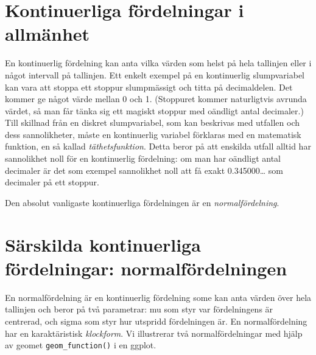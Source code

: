 \documentclass[
]{book}
\theoremstyle{definition}
\theoremstyle{definition}
\theoremstyle{definition}
\theoremstyle{definition}
\theoremstyle{remark}
\begin{document}
\hypertarget{kontinuerliga-fuxf6rdelningar-i-allmuxe4nhet}{%
\section{Kontinuerliga fördelningar i allmänhet}\label{kontinuerliga-fuxf6rdelningar-i-allmuxe4nhet}}

En kontinuerlig fördelning kan anta vilka värden som helst på hela tallinjen eller i något intervall på tallinjen. Ett enkelt exempel på en kontinuerlig slumpvariabel kan vara att stoppa ett stoppur slumpmässigt och titta på decimaldelen. Det kommer ge något värde mellan 0 och 1. (Stoppuret kommer naturligtvis avrunda värdet, så man får tänka sig ett magiskt stoppur med oändligt antal decimaler.) Till skillnad från en diskret slumpvariabel, som kan beskrivas med utfallen och dess sannolikheter, måste en kontinuerlig variabel förklaras med en matematisk funktion, en så kallad \emph{täthetsfunktion}. Detta beror på att enskilda utfall alltid har sannolikhet noll för en kontinuerlig fördelning: om man har oändligt antal decimaler är det som exempel sannolikhet noll att få exakt 0.345000\ldots{} som decimaler på ett stoppur.

Den absolut vanligaste kontinuerliga fördelningen är en \emph{normalfördelning}.

\hypertarget{suxe4rskilda-kontinuerliga-fuxf6rdelningar-normalfuxf6rdelningen}{%
\section{Särskilda kontinuerliga fördelningar: normalfördelningen}\label{suxe4rskilda-kontinuerliga-fuxf6rdelningar-normalfuxf6rdelningen}}

En normalfördelning är en kontinuerlig fördelning some kan anta värden över hela tallinjen och beror på två parametrar: mu som styr var fördelningens är centrerad, och sigma som styr hur utspridd fördelningen är.
En normalfördelning har en karaktäristisk \emph{klockform}. Vi illustrerar två normalfördelningar med hjälp av geomet \texttt{geom\_function()} i en ggplot.
\end{document}
